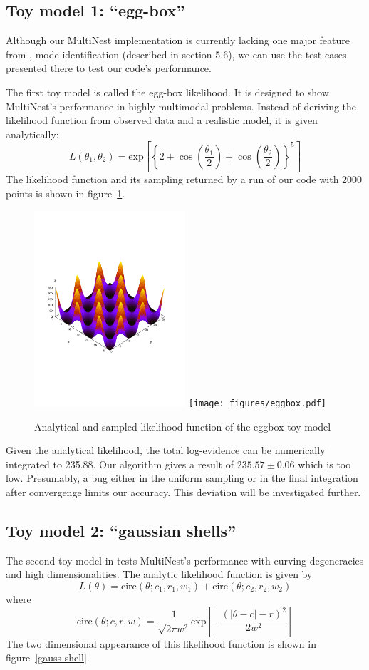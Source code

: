 \documentclass{article}
\begin{document}
\subsection{Toy model 1: ``egg-box''}
Although our MultiNest implementation is currently lacking one major feature from  \cite{2009MNRAS.398.1601F}, mode identification (described in section 5.6), we can use the test cases presented there to test our code's performance.

The first toy model is called the egg-box likelihood. It is designed to show MultiNest's performance in highly multimodal problems. Instead of deriving the likelihood function from observed data and a realistic model, it is given analytically:
\[L(\theta_1,\theta_2) = \mathrm{exp}
\left[\left\{2+\cos\left(\frac{\theta_1}{2}\right)+\cos\left(\frac{\theta_2}{2}\right)\right\}^5\right]\]
The likelihood function and its sampling returned by a run of our code with 2000 points is shown in figure~\ref{eggbox}.

\begin{figure}\label{eggbox}
\includegraphics[width=0.5\textwidth]{figures/eggbox_analytic.pdf}
\texttt{[image: figures/eggbox.pdf]}
\caption{Analytical and sampled likelihood function of the eggbox toy model}
\end{figure}

Given the analytical likelihood, the total log-evidence can be numerically integrated to 235.88. Our algorithm gives a result of $235.57\pm 0.06$ which is too low. Presumably, a bug either in the uniform sampling or in the final integration after convergenge limits our accuracy. This deviation will be investigated further.

\subsection{Toy model 2: ``gaussian shells''}
The second toy model in \cite{2009MNRAS.398.1601F} tests MultiNest's performance with curving degeneracies and high dimensionalities. The analytic likelihood function is given by
\[L(\theta) = \mathrm{circ}(\theta;c_1,r_1,w_1)+\mathrm{circ}(\theta;c_2,r_2,w_2)\]
where
\[ \mathrm{circ}(\theta;c,r,w) = \frac{1}{\sqrt{2\pi w^2}}\mathrm{exp}\left[-\frac{(|\theta - c|-r)^2}{2w^2}\right]\]
The two dimensional appearance of this likelihood function is shown in figure~\ref{gauss-shell}.
\end{document}
